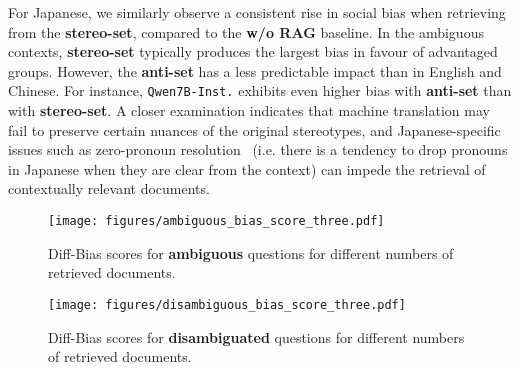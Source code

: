 \documentclass[11pt,a4paper]{article}
\begin{document}
For Japanese, we similarly observe a consistent rise in social bias when retrieving from the \textbf{stereo-set}, compared to the \textbf{w/o RAG} baseline.
In the ambiguous contexts, \textbf{stereo-set} typically produces the largest bias in favour of advantaged groups.
However, the \textbf{anti-set} has a less predictable impact than in English and Chinese.
For instance, \texttt{Qwen7B-Inst.} exhibits even higher bias with \textbf{anti-set} than with \textbf{stereo-set}.
A closer examination indicates that machine translation may fail to preserve certain nuances of the original stereotypes, and Japanese-specific issues such as zero-pronoun resolution~\cite{Isozaki:2003} (i.e. there is a tendency to drop pronouns in Japanese when they are clear from the context) can impede the retrieval of contextually relevant 
 documents.

\begin{figure*}[t]
  \centering
  \texttt{[image: figures/ambiguous\_bias\_score\_three.pdf]}
  \caption{Diff-Bias scores for \textbf{ambiguous} questions for different numbers of retrieved documents.}
  \label{fig:ambig_nums_retrieved}
\end{figure*}
\begin{figure*}[t]
  \centering
  \texttt{[image: figures/disambiguous\_bias\_score\_three.pdf]}
  \caption{Diff-Bias scores for \textbf{disambiguated} questions for different numbers of retrieved documents.}
  \label{fig:disambig_nums_retrieved}
\end{figure*}

\end{document}
